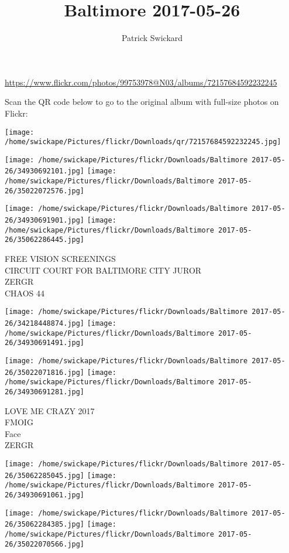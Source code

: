 \documentclass[10pt,letterpaper]{article}
\title{Baltimore 2017-05-26}
\author{Patrick Swickard}
\date{}
\begin{document}
\maketitle

\url{https://www.flickr.com/photos/99753978@N03/albums/72157684592232245}

Scan the QR code below to go to the original album with full-size photos on Flickr:

\texttt{[image: /home/swickape/Pictures/flickr/Downloads/qr/72157684592232245.jpg]}
\pagebreak

\texttt{[image: /home/swickape/Pictures/flickr/Downloads/Baltimore 2017-05-26/34930692101.jpg]}
\texttt{[image: /home/swickape/Pictures/flickr/Downloads/Baltimore 2017-05-26/35022072576.jpg]}

\texttt{[image: /home/swickape/Pictures/flickr/Downloads/Baltimore 2017-05-26/34930691901.jpg]}
\texttt{[image: /home/swickape/Pictures/flickr/Downloads/Baltimore 2017-05-26/35062286445.jpg]}

FREE VISION SCREENINGS\\
CIRCUIT COURT FOR BALTIMORE CITY JUROR\\
ZERGR\\
CHAOS 44
\pagebreak

\texttt{[image: /home/swickape/Pictures/flickr/Downloads/Baltimore 2017-05-26/34218448874.jpg]}
\texttt{[image: /home/swickape/Pictures/flickr/Downloads/Baltimore 2017-05-26/34930691491.jpg]}

\texttt{[image: /home/swickape/Pictures/flickr/Downloads/Baltimore 2017-05-26/35022071816.jpg]}
\texttt{[image: /home/swickape/Pictures/flickr/Downloads/Baltimore 2017-05-26/34930691281.jpg]}

LOVE ME CRAZY 2017\\
FMOIG\\
Face\\
ZERGR
\pagebreak

\texttt{[image: /home/swickape/Pictures/flickr/Downloads/Baltimore 2017-05-26/35062285045.jpg]}
\texttt{[image: /home/swickape/Pictures/flickr/Downloads/Baltimore 2017-05-26/34930691061.jpg]}

\texttt{[image: /home/swickape/Pictures/flickr/Downloads/Baltimore 2017-05-26/35062284385.jpg]}
\texttt{[image: /home/swickape/Pictures/flickr/Downloads/Baltimore 2017-05-26/35022070566.jpg]}
\end{document}
